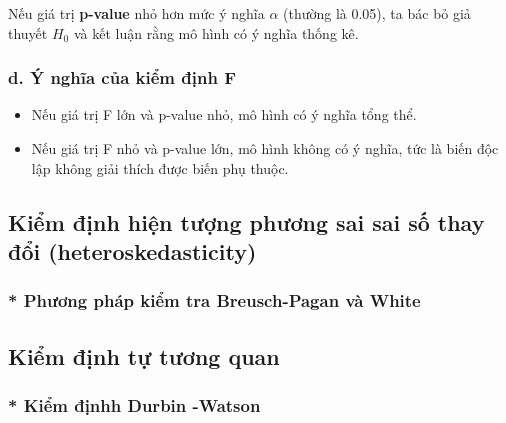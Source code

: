 Nếu giá trị \textbf{p-value} nhỏ hơn mức ý nghĩa \( \alpha \) (thường là 0.05), ta bác bỏ giả thuyết \( H_0 \) và kết luận rằng mô hình có ý nghĩa thống kê.

\subsubsection{d. Ý nghĩa của kiểm định F}
\begin{itemize}
    \item Nếu giá trị F lớn và p-value nhỏ, mô hình có ý nghĩa tổng thể.
    \item Nếu giá trị F nhỏ và p-value lớn, mô hình không có ý nghĩa, tức là biến độc lập không giải thích được biến phụ thuộc.
\end{itemize}




\subsection{Kiểm định hiện tượng phương sai sai số thay đổi (heteroskedasticity)}
\subsubsection{* Phương pháp kiểm tra Breusch-Pagan và White}
\subsection{Kiểm định tự tương quan}
\subsubsection*{* Kiểm địnhh Durbin -Watson}